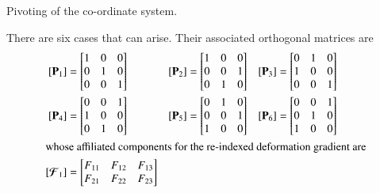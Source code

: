 \begin{algorithm}
    \caption{Pivoting of the co-ordinate system.}
    \label{alg:pivoting}
\end{algorithm}

There are six cases that can arise.  Their associated orthogonal matrices are
\begin{subequations}
    \begin{align}
    [ \mathbf{P}_1 ] & = \begin{bmatrix}
    1 & 0 & 0\\
    0 & 1 & 0\\
    0 & 0 & 1
    \end{bmatrix} & 
    [ \mathbf{P}_2 ] & = \begin{bmatrix}
    1 & 0 & 0\\
    0 & 0 & 1\\
    0 & 1 & 0
    \end{bmatrix} &
    [ \mathbf{P}_3 ] & = \begin{bmatrix}
    0 & 1 & 0\\
    1 & 0 & 0\\
    0 & 0 & 1
    \end{bmatrix} \notag \\
    [ \mathbf{P}_4 ] & = 
    \begin{bmatrix}
    0 & 0 & 1\\
    1 & 0 & 0\\
    0 & 1 & 0
    \end{bmatrix} & 
    [ \mathbf{P}_5 ] & = \begin{bmatrix}
    0 & 1 & 0\\
    0 & 0 & 1\\
    1 & 0 & 0
    \end{bmatrix} &
    [ \mathbf{P}_6 ] & = \begin{bmatrix}
    0 & 0 & 1\\
    0 & 1 & 0\\
    1 & 0 & 0
    \end{bmatrix} \\
    \intertext{whose affiliated components for the re-indexed deformation gradient are}
    [ \boldsymbol{\mathcal{F}}_1 ] & = \begin{bmatrix}
    F_{11} & F_{12} & F_{13}\\
    F_{21} & F_{22} & F_{23}\\

\end{bmatrix}
\end{align}
\end{subequations}

